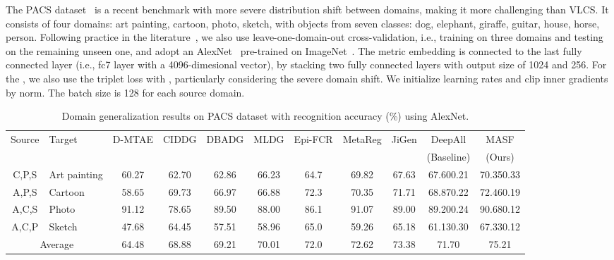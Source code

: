 \documentclass{article}
\newcommand\Tstrut{\rule{0pt}{2.6ex}}         \newcommand\Bstrut{\rule[-0.9ex]{0pt}{0pt}}
\begin{document}
The PACS dataset~\citep{li2017deeper} is a recent benchmark with more severe distribution shift between domains, making it more challenging than VLCS. It consists of four domains: art painting, cartoon, photo, sketch, with objects from seven classes: dog, elephant, giraffe, guitar, house, horse, person.
Following practice in the literature~\citep{balaji2018metareg,carlucci2019domain,li2018learning,li2019episodic}, we also use leave-one-domain-out cross-validation, i.e., training on three domains and testing on the remaining unseen one, and adopt an AlexNet~\citep{krizhevsky2012imagenet} pre-trained on ImageNet~\citep{ILSVRC15}. The metric embedding  is connected to the last fully connected layer (i.e., fc7 layer with a 4096-dimesional vector), by stacking two fully connected layers with output size of 1024 and 256.
For the , we also use the triplet loss with , particularly considering the severe domain shift.
We initialize learning rates  and clip inner gradients by norm. The batch size is 128 for each source domain.

\begin{table}[t]
\centering
    \caption{Domain generalization results on PACS dataset with recognition accuracy (\%) using AlexNet.}
    \setlength{\tabcolsep}{3pt}
    \begin{adjustbox}{scale=.85}
    \begin{tabular}{cl|ccccccc|cc}
    \toprule
   \multirow{2}{*}{Source} & \multirow{ 2}{*}{Target}  & D-MTAE   & CIDDG   & DBADG & MLDG & Epi-FCR & MetaReg  & JiGen & DeepAll & MASF \\
    &  & \citep{ghifary2015domain} & \citep{li2018deep} & \cite{li2017deeper} & \citep{li2018learning}  & \cite{li2019episodic} & \citep{balaji2018metareg}  & \cite{carlucci2019domain} & (Baseline) & (Ours) \\
    \hline
{C},{P},{S}  & Art painting  & 60.27  & 62.70  & 62.86  & 66.23    & 64.7  & 69.82  & 67.63  & 67.600.21  & 70.350.33  \Tstrut  \\
{A},{P},{S}  & Cartoon       & 58.65  & 69.73  & 66.97  & 66.88    & 72.3  & 70.35  & 71.71  & 68.870.22  & 72.460.19   \\
{A},{C},{S}  & Photo         & 91.12  & 78.65  & 89.50  & 88.00    & 86.1  & 91.07  & 89.00  & 89.200.24  & 90.680.12    \\
{A},{C},{P}  & Sketch        & 47.68  & 64.45  & 57.51  & 58.96    & 65.0  & 59.26  & 65.18  & 61.130.30  & 67.330.12   \\
    \hline
\multicolumn{2}{c|}{Average} & 64.48  & 68.88  & 69.21  & 70.01   & 72.0   & 72.62  & 73.38  & 71.70  & 75.21 \Tstrut   \\
    \bottomrule
    \end{tabular}
    \end{adjustbox}
    \label{tab:pacs}
    \vspace{5mm}
\end{table}
\end{document}
